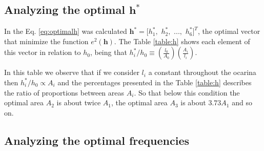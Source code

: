 \documentclass[11pt,twocolumn]{article}
\begin{document}
\subsection{Analyzing the optimal $\mathbf{h^*}$}
In the Eq. \ref{eq:optimalh} was calculated $\mathbf{h^*}=[h_1^*,$ $h_2^*,$ $...,$ $h_6^*]^{T}$, 
the optimal vector that minimize the function $e^2(\mathbf{h})$. 
The Table \ref{table:h} shows each element of this vector in relation to $h_0$, 
being that $ h_{i}^*/h_{0} \equiv  \left( \frac{l_0}{A_0}\right) \left( \frac{A_{i}}{l_{i}}    \right)$.
\begin{table}[h]
\center
{}
\caption{Percentage ratio between $h_{i}^*$ and $h_{0}$.}
\label{table:h}
\end{table}

In this table we observe that if 
we consider $l_{i}$ a constant throughout the ocarina 
then $h_{i}^*/h_{0} \propto A_{i}$ and 
the percentages presented in the Table \ref{table:h} describes the ratio of proportions between areas $A_i$.
So that below this condition 
the optimal area $A_{2}$ is about twice $A_{1}$, 
the optimal area $A_{3}$ is about $3.73 A_{1}$   
and so on.




\subsection{Analyzing the optimal frequencies}
\end{document}
